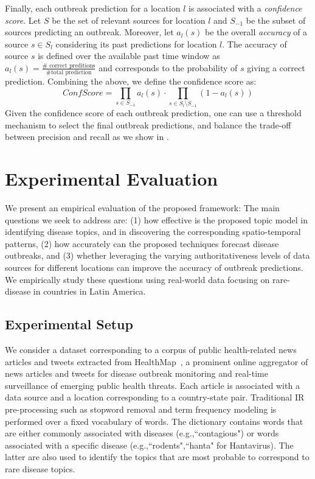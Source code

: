 \documentclass[conference]{IEEEtran}
\begin{document}
Finally, each outbreak prediction for a location $l$ is associated with a {\em confidence score}. Let $S$ be the set of relevant sources for location $l$ and $S_{-1}$ be the subset of sources predicting an outbreak. Moreover, let $a_l(s)$ be the overall {\em accuracy} of a source $s \in S_l$ considering its past predictions for location $l$. The accuracy of source $s$ is defined over the available past time window as $a_l(s) = \frac{\#\mbox{ correct preditions}}{\#\mbox{total prediction}}$ and corresponds to the probability of $s$ giving a correct prediction. Combining the above, we define the confidence score as: 
\begin{equation}
ConfScore = \prod_{s \in S_{-1}}a_l(s) \cdot \prod_{s \in S_l \setminus S_{-1}} (1 - a_l(s))
\end{equation}
Given the confidence score of each outbreak prediction, one can use a threshold mechanism to select the final outbreak predictions, and balance the trade-off between precision and recall as we show in . 

\section{Experimental Evaluation}
\label{sec:exp}
We present an empirical evaluation of the proposed framework: The main questions we seek to address are: (1) how effective is the proposed topic model in identifying disease topics, and in discovering the corresponding spatio-temporal patterns, (2) how accurately can the proposed techniques forecast disease outbreaks, and (3) whether leveraging the varying authoritativeness levels of data sources for different locations can improve the accuracy of outbreak predictions. We empirically study these questions using real-world data focusing on rare-disease in countries in Latin America.

\subsection{Experimental Setup}
 We consider a dataset corresponding to a corpus of public health-related news articles and tweets extracted from HealthMap~\cite{healthmap}, a prominent online aggregator of news articles and tweets for disease outbreak monitoring and real-time surveillance of emerging public health threats. Each article is associated with a data source and a location corresponding to a country-state pair. Traditional IR pre-processing such as stopword removal and term frequency modeling is performed over a fixed vocabulary of words. The dictionary contains words that are either commonly associated with diseases (e.g.,``contagious") or words associated with a specific disease (e.g.,``rodents",``hanta" for Hantavirus). The latter are also used to identify the topics that are most probable to correspond to rare disease topics. 
\end{document}
